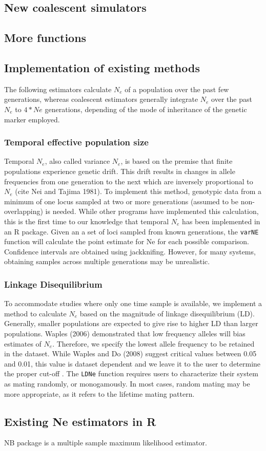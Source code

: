 \documentclass[english,titlepage]{article}
\begin{document}
\subsection*{New coalescent simulators}
\citep{Palacios2013}

\subsection*{More functions}
\citep{Hein2005}


\subsection*{Implementation of existing methods}

The following estimators calculate $N_e$ of a population over the past few generations, whereas coalescent estimators generally integrate $N_e$ over the past $N_e$ to $4*Ne$ generations, depending of the mode of inheritance of the genetic marker employed.

\subsubsection*{Temporal effective population size}

Temporal $N_e$, also called variance $N_e$, is based on the premise that finite populations experience genetic drift. This drift results in changes in allele frequencies from one generation to the next which are inversely proportional to $N_e$ (cite Nei and Tajima 1981). To implement this method, genotypic data from a minimum of one locus sampled at two or more generations (assumed to be non-overlapping) is needed. While other programs have implemented this calculation, this is the first time to our knowledge that temporal $N_e$ has been implemented in an R package. Given an a set of loci sampled from known generations, the \texttt{varNE} function will calculate the point estimate for Ne for each possible comparison. Confidence intervals are obtained using jackknifing. However, for many systems, obtaining samples across multiple generations may be unrealistic.

\subsubsection*{Linkage Disequilibrium}

To accommodate studies where only one time sample is available, we implement a method to calculate $N_e$ based on the magnitude of linkage disequilibrium (LD). Generally, smaller populations are expected to give rise to higher LD than larger populations. 
Waples (2006) demonstrated that low frequency alleles will bias estimates of $N_e$. Therefore, we specify the lowest allele frequency to be retained in the dataset.  While Waples and Do (2008) suggest critical values between 0.05 and 0.01, this value is dataset dependent and we leave it to the user to determine the proper cut-off \citep{Waples2010,Waples2008}. The \texttt{LDNe} function requires users to characterize their system as mating randomly, or monogamously. In most cases, random mating may be more appropriate, as it refers to the lifetime mating pattern. 

\subsection{Existing Ne estimators in R}
NB package is a multiple sample maximum likelihood estimator\citep{Hui2014}.
  


\end{document}
